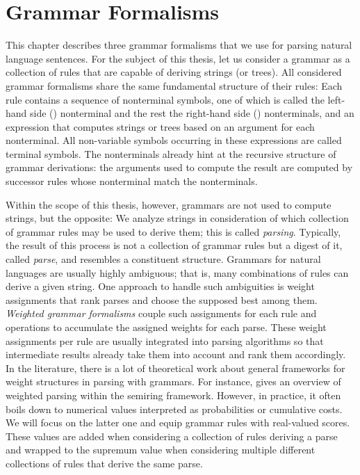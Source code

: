 \documentclass[../document.tex]{subfiles}
\begin{document}
    \chapter{Grammar Formalisms}\label{sec:grammars}
    This chapter describes three grammar formalisms that we use for parsing natural language sentences.
    For the subject of this thesis, let us consider a grammar as a collection of rules that are capable of deriving strings (or trees).
    All considered grammar formalisms share the same fundamental structure of their rules:
        Each rule contains a sequence of nonterminal symbols, one of which is called the left-hand side () nonterminal and the rest the right-hand side () nonterminals, and an expression that computes strings or trees based on an argument for each  nonterminal.
        All non-variable symbols occurring in these expressions are called terminal symbols.
    The nonterminals already hint at the recursive structure of grammar derivations: the arguments used to compute the result are computed by successor rules whose  nonterminal match the  nonterminals.

    Within the scope of this thesis, however, grammars are not used to compute strings, but the opposite:
        We analyze strings in consideration of which collection of grammar rules may be used to derive them; this is called \emph{parsing}.
    Typically, the result of this process is not a collection of grammar rules but a digest of it, called \emph{parse}, and resembles a constituent structure.
    Grammars for natural languages are usually highly ambiguous; that is, many combinations of rules can derive a given string.
    One approach to handle such ambiguities is weight assignments that rank parses and choose the supposed best among them.
    \emph{Weighted grammar formalisms} couple such assignments for each rule and operations to accumulate the assigned weights for each parse.
    These weight assignments per rule are usually integrated into parsing algorithms so that intermediate results already take them into account and rank them accordingly.
    In the literature, there is a lot of theoretical work about general frameworks for weight structures in parsing with grammars.
    For instance, \citet{Goodman} gives an overview of weighted parsing within the semiring framework.
    However, in practice, it often boils down to numerical values interpreted as probabilities or cumulative costs.
    We will focus on the latter one and equip grammar rules with real-valued scores.
    These values are added when considering a collection of rules deriving a parse and wrapped to the supremum value when considering multiple different collections of rules that derive the same parse.
\end{document}

